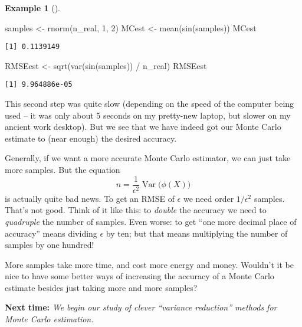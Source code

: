 \documentclass[
  letterpaper,
  DIV=11,
  numbers=noendperiod]{scrreprt}
\newenvironment{Shaded}{\begin{snugshade}}{\end{snugshade}}
\newcommand{\DecValTok}[1]{\textcolor[rgb]{0.68,0.00,0.00}{#1}}
\newcommand{\FunctionTok}[1]{\textcolor[rgb]{0.28,0.35,0.67}{#1}}
\newcommand{\NormalTok}[1]{\textcolor[rgb]{0.00,0.23,0.31}{#1}}
\newcommand{\OtherTok}[1]{\textcolor[rgb]{0.00,0.23,0.31}{#1}}
\newcommand{\SpecialCharTok}[1]{\textcolor[rgb]{0.37,0.37,0.37}{#1}}
\newcommand{\Var}{\operatorname{Var}}
\theoremstyle{plain}
\theoremstyle{definition}
\theoremstyle{definition}
\newtheorem{example}{Example}[chapter]
\theoremstyle{remark}
\begin{document}
\begin{example}[]
\begin{Shaded}
\begin{Highlighting}[]
\NormalTok{samples }\OtherTok{\textless{}{-}} \FunctionTok{rnorm}\NormalTok{(n\_real, }\DecValTok{1}\NormalTok{, }\DecValTok{2}\NormalTok{)}
\NormalTok{MCest }\OtherTok{\textless{}{-}} \FunctionTok{mean}\NormalTok{(}\FunctionTok{sin}\NormalTok{(samples))}
\NormalTok{MCest}
\end{Highlighting}
\end{Shaded}

\begin{verbatim}
[1] 0.1139149
\end{verbatim}

\begin{Shaded}
\begin{Highlighting}[]
\NormalTok{RMSEest }\OtherTok{\textless{}{-}} \FunctionTok{sqrt}\NormalTok{(}\FunctionTok{var}\NormalTok{(}\FunctionTok{sin}\NormalTok{(samples)) }\SpecialCharTok{/}\NormalTok{ n\_real)}
\NormalTok{RMSEest}
\end{Highlighting}
\end{Shaded}

\begin{verbatim}
[1] 9.964886e-05
\end{verbatim}

This second step was quite slow (depending on the speed of the computer
being used -- it was only about 5 seconds on my pretty-new laptop, but
slower on my ancient work desktop). But we see that we have indeed got
our Monte Carlo estimate to (near enough) the desired accuracy.

\end{example}

Generally, if we want a more accurate Monte Carlo estimator, we can just
take more samples. But the equation
\[ n = \frac{1}{\epsilon^2} \Var\big(\phi(X)\big) \] is actually quite
bad news. To get an RMSE of \(\epsilon\) we need order \(1/\epsilon^2\)
samples. That's not good. Think of it like this: to \emph{double} the
accuracy we need to \emph{quadruple} the number of samples. Even worse:
to get ``one more decimal place of accuracy'' means dividing
\(\epsilon\) by ten; but that means multiplying the number of samples by
one hundred!

More samples take more time, and cost more energy and money. Wouldn't it
be nice to have some better ways of increasing the accuracy of a Monte
Carlo estimate besides just taking more and more samples?

\textbf{Next time:} \emph{We begin our study of clever ``variance
reduction'' methods for Monte Carlo estimation.}
\end{document}

